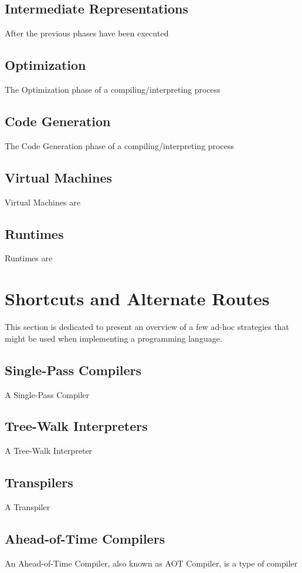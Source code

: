 \subsection{Intermediate Representations}
After the previous phases have been executed

\subsection{Optimization}
The Optimization phase of a compiling/interpreting process

\subsection{Code Generation}
The Code Generation phase of a compiling/interpreting process


\subsection{Virtual Machines}
Virtual Machines are 

\subsection{Runtimes}
Runtimes are

\section{Shortcuts and Alternate Routes}
This section is dedicated to present an overview of a few ad-hoc strategies that might be used when implementing a programming language.

\subsection{Single-Pass Compilers}
A Single-Pass Compiler
\subsection{Tree-Walk Interpreters}
A Tree-Walk Interpreter

\subsection{Transpilers}
A Transpiler

\subsection{Ahead-of-Time Compilers}
An Ahead-of-Time Compiler, also known as AOT Compiler, is a type of compiler


